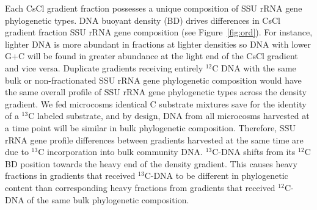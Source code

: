 Each CsCl gradient fraction possesses a unique composition of SSU rRNA gene
phylogenetic types. DNA buoyant density (BD) drives differences in CsCl
gradient fraction SSU rRNA gene composition (see Figure~\ref{fig:ord}). For
instance, lighter DNA is more abundant in fractions at lighter densities so DNA
with lower G+C will be found in greater abundance at the light end of the CsCl
gradient and vice versa. Duplicate gradients receiving entirely $^{12}$C DNA with
the same bulk or non-fractionated SSU rRNA gene phylogenetic composition would
have the same overall profile of SSU rRNA gene phylogenetic types across the
density gradient. We fed microcosms identical C substrate mixtures save for the
identity of a $^{13}$C labeled substrate, and by design, DNA from all
microcosms harvested at a time point will be similar in bulk phylogenetic
composition. Therefore, SSU rRNA gene profile differences between
gradients harvested at the same time are due to $^{13}$C incorporation into
bulk community DNA. $^{13}$C-DNA shifts from its $^{12}$C BD position towards the
heavy end of the density gradient. This causes heavy fractions in gradients
that received $^{13}$C-DNA to be different in phylogenetic content than
corresponding heavy fractions from gradients that received $^{12}$C-DNA of the
same bulk phylogenetic composition.

